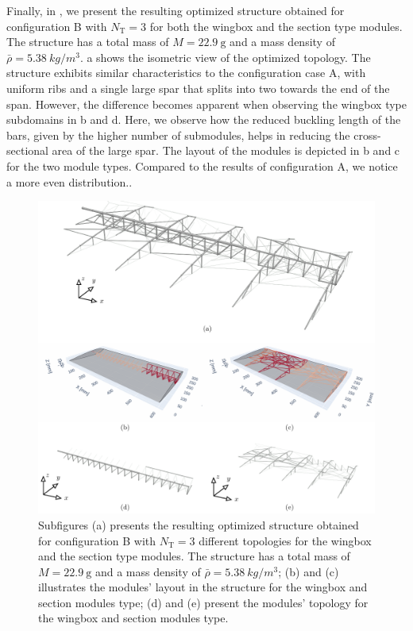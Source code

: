 Finally, in , we present the resulting optimized structure obtained for configuration B with $N_\text{T}=3$ for both the wingbox and the section type modules. The structure has a total mass of $M=\qty{22.9}{\gram}$ and a mass density of $\bar{\rho}=\qty{5.38}{kg/m^3}$. a shows the isometric view of the optimized topology. The structure exhibits similar characteristics to the configuration case A, with uniform ribs and a single large spar that splits into two towards the end of the span. However, the difference becomes apparent when observing the wingbox type subdomains in b and d. Here, we observe how the reduced buckling length of the bars, given by the higher number of submodules, helps in reducing the cross-sectional area of the large spar. The layout of the modules is depicted in b and c for the two module types. Compared to the results of configuration A, we notice a more even distribution..

\begin{figure}
    \centering
    \includegraphics[width=\linewidth]{figures/07_aeronautic/00_NACA_b_sol_3/gs_a.pdf}
        \caption{Subfigures (a) presents the resulting optimized structure obtained for configuration B with $N_\text{T}=3$ different topologies for the wingbox and the section type modules. The structure has a total mass of $M=\qty{22.9}{\gram}$ and a mass density of $\bar{\rho}=\qty{5.38}{kg/m^3}$; (b) and (c) illustrates the modules' layout in the structure for the wingbox and section modules type; (d) and (e) present the modules' topology for the wingbox and section modules type.}
    \label{fig:07_topology_naca_b}
\end{figure}

